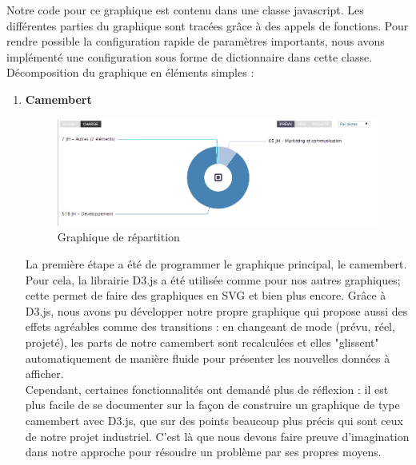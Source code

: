 \documentclass[12pt]{report}
\begin{document}
Notre code pour ce graphique est contenu dans une classe javascript. Les différentes parties du graphique sont tracées grâce à des appels de fonctions. Pour rendre possible la configuration rapide de paramètres importants, nous avons implémenté une configuration sous forme de dictionnaire dans cette classe.\\

Décomposition du graphique en éléments simples :\\

\begin{enumerate}
\item \textbf{Camembert}\\

\begin{figure}[H]
	\centering
	\includegraphics[width=1\textwidth]{pictures/realisations/camembert.jpg}
	\caption{Graphique de répartition}
	\label{18}
\end{figure}

La première étape a été de programmer le graphique principal, le camembert. Pour cela, la librairie D3.js a été utilisée comme pour nos autres graphiques; cette permet de faire des graphiques en SVG et bien plus encore. Grâce à D3.js, nous avons pu développer notre propre graphique qui propose aussi des effets agréables comme des transitions : en changeant de mode (prévu, réel, projeté), les parts de notre camembert sont recalculées et elles "glissent" automatiquement de manière fluide pour présenter les nouvelles données à afficher.\\

Cependant, certaines fonctionnalités ont demandé plus de réflexion : il est plus facile de se documenter sur la façon de construire un graphique de type camembert avec D3.js, que sur des points beaucoup plus précis qui sont ceux de notre projet industriel. C'est là que nous devons faire preuve d'imagination dans notre approche pour résoudre un problème par ses propres moyens. \\


\end{enumerate}
\end{document}
